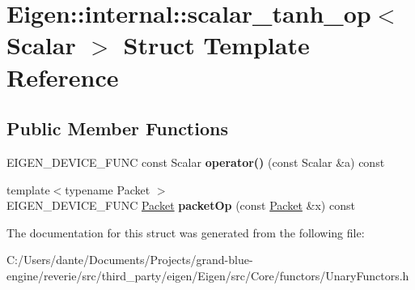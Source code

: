 \hypertarget{struct_eigen_1_1internal_1_1scalar__tanh__op}{}\section{Eigen\+::internal\+::scalar\+\_\+tanh\+\_\+op$<$ Scalar $>$ Struct Template Reference}
\label{struct_eigen_1_1internal_1_1scalar__tanh__op}
\subsection*{Public Member Functions}
\begin{DoxyCompactItemize}
\item 
\mbox{\label{struct_eigen_1_1internal_1_1scalar__tanh__op_ad5f9d64ebea18a798012e67bb4a4c894}} 
E\+I\+G\+E\+N\+\_\+\+D\+E\+V\+I\+C\+E\+\_\+\+F\+U\+NC const Scalar {\bfseries operator()} (const Scalar \&a) const
\item 
\mbox{\label{struct_eigen_1_1internal_1_1scalar__tanh__op_a5a42ae6b52110e5c3671bdf0fd1becc6}} 
{\footnotesize template$<$typename Packet $>$ }\\E\+I\+G\+E\+N\+\_\+\+D\+E\+V\+I\+C\+E\+\_\+\+F\+U\+NC \mbox{\hyperlink{union_eigen_1_1internal_1_1_packet}{Packet}} {\bfseries packet\+Op} (const \mbox{\hyperlink{union_eigen_1_1internal_1_1_packet}{Packet}} \&x) const
\end{DoxyCompactItemize}


The documentation for this struct was generated from the following file\+:\begin{DoxyCompactItemize}
\item 
C\+:/\+Users/dante/\+Documents/\+Projects/grand-\/blue-\/engine/reverie/src/third\+\_\+party/eigen/\+Eigen/src/\+Core/functors/Unary\+Functors.\+h\end{DoxyCompactItemize}
